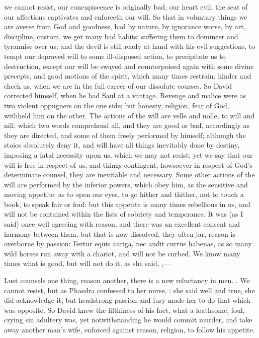 {we cannot resist, our concupiscence is originally bad, our heart evil,
the seat of our affections captivates and enforceth our will. So that
in voluntary things we are averse from God and goodness, bad by nature,
by ignorance worse, by art, discipline, custom, we get many bad
habits: suffering them to domineer and tyrannise over us; and the devil
is still ready at hand with his evil suggestions, to tempt our depraved
will to some ill-disposed action, to precipitate us to destruction,
except our will be swayed and counterpoised again with some divine
precepts, and good motions of the spirit, which many times restrain,
hinder and check us, when we are in the full career of our dissolute
courses. So David corrected himself, when he had Saul at a vantage.
Revenge and malice were as two violent oppugners on the one side; but
honesty, religion, fear of God, withheld him on the other.
The actions of the will are velle and nolle, to will and nill: which
two words comprehend all, and they are good or bad, accordingly as they
are directed, and some of them freely performed by himself; although
the stoics absolutely deny it, and will have all things inevitably done
by destiny, imposing a fatal necessity upon us, which we may not
resist; yet we say that our will is free in respect of us, and things
contingent, howsoever in respect of God's determinate counsel, they are
inevitable and necessary. Some other actions of the will are performed
by the inferior powers, which obey him, as the sensitive and moving
appetite; as to open our eyes, to go hither and thither, not to touch a
book, to speak fair or foul: but this appetite is many times rebellious
in us, and will not be contained within the lists of sobriety and
temperance. It was (as I said) once well agreeing with reason, and
there was an excellent consent and harmony between them, but that is
now dissolved, they often jar, reason is overborne by passion: Fertur
equis auriga, nec audit currus habenas, as so many wild horses run away
with a chariot, and will not be curbed. We know many times what is
good, but will not do it, as she said,
,---

Lust counsels one thing, reason another, there is a new reluctancy in
men. . We cannot
resist, but as Phaedra confessed to her nurse, : she said well and true, she
did acknowledge it, but headstrong passion and fury made her to do that
which was opposite. So David knew the filthiness of his fact, what a
loathsome, foul, crying sin adultery was, yet notwithstanding he would
commit murder, and take away another man's wife, enforced against
reason, religion, to follow his appetite.

}
